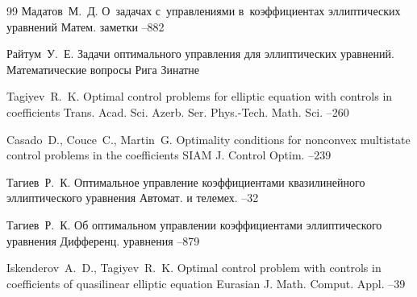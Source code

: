\begin{thebibliography}{99}
\by Мадатов~М.~Д.
\paper О~задачах с~управлениями в~коэффициентах эллиптических уравнений
\jour Матем. заметки
--882

\by Райтум~У.~Е.
\book Задачи оптимального управления для эллиптических уравнений. Математические вопросы
\publaddr Рига
\publ Зинатне

\by Tagiyev~R.~K.
\paper Optimal control problems for elliptic equation with controls in coefficients
\jour Trans. Acad. Sci. Azerb. Ser. Phys.-Tech. Math. Sci. 
--260


\by Casado~D., Couce~C., Martin~G.
\paper Optimality conditions for nonconvex multistate control problems in the coefficients 
\jour SIAM J. Control Optim.
--239

\by Тагиев~Р.~К.
\paper Оптимальное управление коэффициентами квазилинейного эллиптического уравнения
\jour Автомат. и телемех.
--32

\by Тагиев~Р.~К.
\paper Об оптимальном управлении коэффициентами эллиптического уравнения 
\jour Дифференц. уравнения
--879

\by Iskenderov~A.~D., Tagiyev~R.~K.
\paper Optimal control problem with controls in coefficients of quasilinear elliptic equation 
\jour  Eurasian J. Math. Comput. Appl.
--39



\end{thebibliography}
